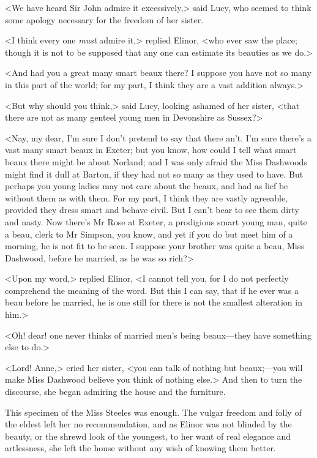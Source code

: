 <We have heard Sir John admire it excessively,> said Lucy, who seemed to think some apology necessary for the freedom of her sister.

<I think every one \textit{must} admire it,> replied Elinor, <who ever saw the place; though it is not to be supposed that any one can estimate its beauties as we do.>

<And had you a great many smart beaux there? I suppose you have not so many in this part of the world; for my part, I think they are a vast addition always.>

<But why should you think,> said Lucy, looking ashamed of her sister, <that there are not as many genteel young men in Devonshire as Sussex?>

<Nay, my dear, I'm sure I don't pretend to say that there an't. I'm sure there's a vast many smart beaux in Exeter; but you know, how could I tell what smart beaux there might be about Norland; and I was only afraid the Miss Dashwoods might find it dull at Barton, if they had not so many as they used to have. But perhaps you young ladies may not care about the beaux, and had as lief be without them as with them. For my part, I think they are vastly agreeable, provided they dress smart and behave civil. But I can't bear to see them dirty and nasty. Now there's Mr Rose at Exeter, a prodigious smart young man, quite a beau, clerk to Mr Simpson, you know, and yet if you do but meet him of a morning, he is not fit to be seen. I suppose your brother was quite a beau, Miss Dashwood, before he married, as he was so rich?>

<Upon my word,> replied Elinor, <I cannot tell you, for I do not perfectly comprehend the meaning of the word. But this I can say, that if he ever was a beau before he married, he is one still for there is not the smallest alteration in him.>

<Oh! dear! one never thinks of married men's being beaux—they have something else to do.>

<Lord! Anne,> cried her sister, <you can talk of nothing but beaux;—you will make Miss Dashwood believe you think of nothing else.> And then to turn the discourse, she began admiring the house and the furniture.

This specimen of the Miss Steeles was enough. The vulgar freedom and folly of the eldest left her no recommendation, and as Elinor was not blinded by the beauty, or the shrewd look of the youngest, to her want of real elegance and artlessness, she left the house without any wish of knowing them better.

